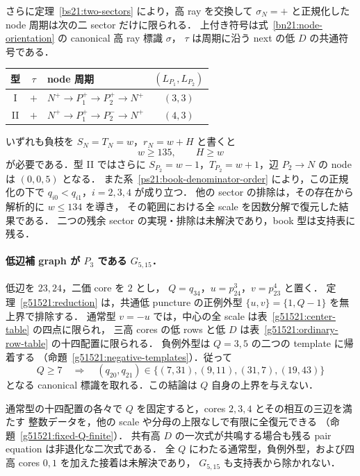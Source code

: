さらに定理~\ref{bs21:two-sectors} により，高 ray を交換して
$\sigma_N=+$ と正規化した node 周期は次の二 sector だけに限られる．
上付き符号は式~\eqref{bn21:node-orientation} の canonical 高 ray 標識 $\sigma$，
$\tau$ は周期に沿う next の低 $D$ の共通符号である．
\begin{center}\small
\begin{tabular}{cclc}
型&$\tau$&node 周期&$(L_{P_1},L_{P_2})$\\\hline
I&$+$&$N^+\to P_1^+\to P_2^+\to N^+$&$(3,3)$\\
II&$+$&$N^+\to P_1^+\to P_2^-\to N^+$&$(4,3)$
\end{tabular}
\end{center}
いずれも負枝を $S_N=T_N=w$，$r_N=w+H$ と書くと
\[
 w\ge135,\qquad H\ge w
\]
が必要である．型 II ではさらに
$S_{P_2}=w-1$，$T_{P_2}=w+1$，辺 $P_2\to N$ の node は $(0,0,5)$ となる．
また系~\ref{ps21:book-denominator-order} により，この正規化の下で
$q_{i0}<q_{i1}$，$i=2,3,4$ が成り立つ．
他の sector の排除は，その存在から解析的に $w\le134$ を導き，
その範囲における全 scale を因数分解で復元した結果である．
二つの残余 sector の実現・排除は未解決であり，book 型は支持表に残る．

\paragraph{低辺補 graph が $P_3$ である $G_{5,15}$．}
低辺を $23,24$，二価 core を $2$ とし，
$Q=q_{34}$，$u=p^3_{24}$，$v=p^4_{23}$ と置く．
定理~\ref{g51521:reduction} は，共通低 puncture の正例外型
$\{u,v\}=\{1,Q-1\}$ を無上界で排除する．
通常型 $v=-u$ では，中心の全 scale は表~\ref{g51521:center-table} の四点に限られ，
三高 cores の低 rows と低 $D$ は表~\ref{g51521:ordinary-row-table} の十四配置に限られる．
負例外型は $Q=3,5$ の二つの template に帰着する
（命題~\ref{g51521:negative-templates}）．従って
\[
 Q\ge7\quad\Longrightarrow\quad
 (q_{20},q_{21})\in\{(7,31),(9,11),(31,7),(19,43)\}
\]
となる canonical 標識を取れる．この結論は $Q$ 自身の上界を与えない．

通常型の十四配置の各々で $Q$ を固定すると，cores $2,3,4$ とその相互の三辺を満たす
整数データを，他の scale や分母の上限なしで有限に全復元できる
（命題~\ref{g51521:fixed-Q-finite}）．
共有高 $D$ の一次式が共鳴する場合も残る pair equation は非退化な二次式である．
全 $Q$ にわたる通常型，負例外型，および四高 cores $0,1$ を加えた接着は未解決であり，
$G_{5,15}$ も支持表から除かれない．

